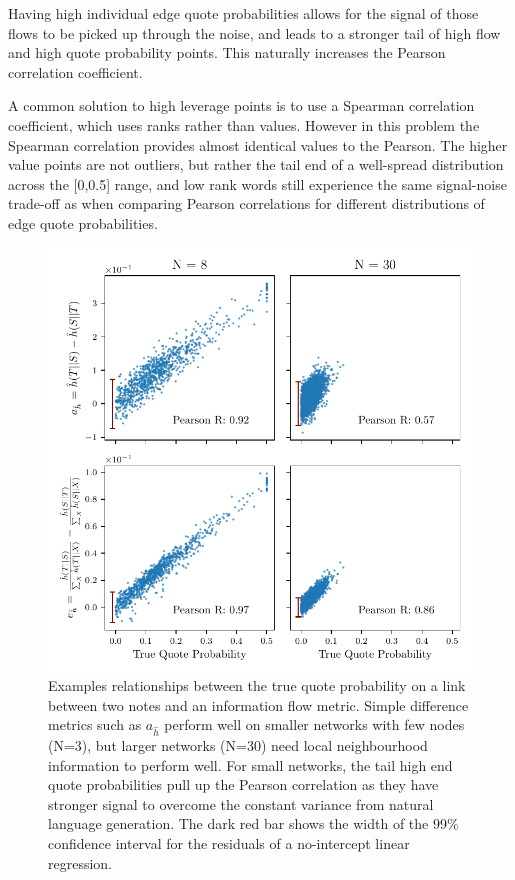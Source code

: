 Having high individual edge quote probabilities allows for the signal of those flows to be picked up through the noise, and leads to a stronger tail of high flow and high quote probability points. This naturally increases the Pearson correlation coefficient.

A common solution to high leverage points is to use a Spearman correlation coefficient, which uses ranks rather than values. However in this problem the Spearman correlation provides almost identical values to the Pearson. The higher value points are not outliers, but rather the tail end of a well-spread distribution across the [0,0.5] range, and low rank words still experience the same signal-noise trade-off as when comparing Pearson correlations for different distributions of edge quote probabilities.


\begin{figure}[!htbp]
	\centering
	\includegraphics{chapter3/figs/scatterplot_comparison.pdf}
	\caption{Examples relationships between the true quote probability on a link between two notes and an information flow metric. Simple difference metrics such as $a_{\hat{h}}$ perform well on smaller networks with few nodes (N=3), but larger networks (N=30) need local neighbourhood information to perform well. For small networks, the tail high end quote probabilities pull up the Pearson correlation as they have stronger signal to overcome the constant variance from natural language generation. The {\color{red!40!black}dark red} bar shows the width of the 99\% confidence interval for the residuals of a no-intercept linear regression.}
	\label{fig:flow_quote_scatterplot}
\end{figure}

